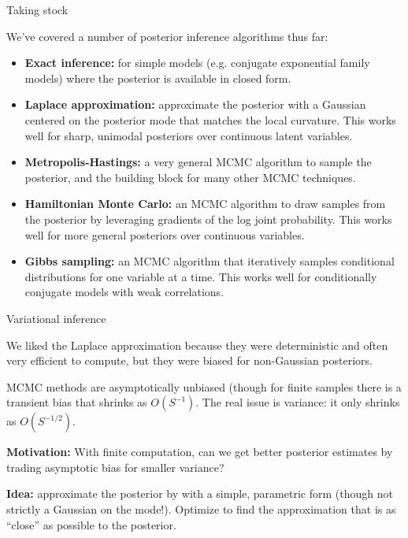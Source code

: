 \documentclass[aspectratio=169]{beamer}
\begin{document}
\begin{frame}{Taking stock}
    
We've covered a number of posterior inference algorithms thus far:
\begin{itemize}
    \item \textbf{Exact inference:} for simple models (e.g. conjugate exponential family models) where the posterior is available in closed form.
    
    \item \textbf{Laplace approximation:} approximate the posterior with a Gaussian centered on the posterior mode that matches the local curvature. This works well for sharp, unimodal posteriors over continuous latent variables.
    
    \item \textbf{Metropolis-Hastings: } a very general MCMC algorithm to sample the posterior, and the building block for many other MCMC techniques.
    
    \item \textbf{Hamiltonian Monte Carlo: } an MCMC algorithm to draw samples from the posterior by leveraging gradients of the log joint probability. This works well for more general posteriors over continuous variables.
    
    \item \textbf{Gibbs sampling:} an MCMC algorithm that iteratively samples conditional distributions for one variable at a time. This works well for conditionally conjugate models with weak correlations.
\end{itemize}
\end{frame}

\begin{frame}{Variational inference}

We liked the Laplace approximation because they were deterministic and often very efficient to compute, but they were biased for non-Gaussian posteriors.

MCMC methods are asymptotically unbiased (though for finite samples there is a transient bias that shrinks as $O(S^{-1})$. The real issue is variance: it only shrinks as $O(S^{-1/2})$.

\textbf{Motivation: } With finite computation, can we get better posterior estimates by trading asymptotic bias for smaller variance? 

\textbf{Idea: } approximate the posterior by with a simple, parametric form (though not strictly a Gaussian on the mode!). Optimize to find the approximation that is as ``close'' as possible to the posterior.
    
\end{frame}
\end{document}
